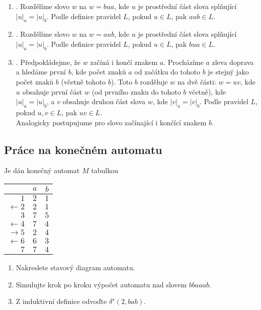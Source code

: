 \begin{enumerate}[label={}]
    \item {}. Rozdělíme slovo $w$ na $w = bua$, kde $u$ je prostřední část slova splňující
    $|u|_a = |u|_b$. Podle definice pravidel $L$, pokud $u \in L$, pak $aub \in L$.
    \item {}. Rozdělíme slovo $w$ na $w = aub$, kde $u$ je prostřední část slova splňující
    $|u|_a = |u|_b$. Podle definice pravidel $L$, pokud $u \in L$, pak $bua \in L$.
    \item {}. Předpokládejme, že $w$ začíná i končí znakem $a$. Procházíme $a$ zleva
    doprava a hledáme první $b$, kde počet znaků $a$ od začátku do tohoto $b$ je stejný jako počet znaků $b$ (včetně
    tohoto $b$). Toto $b$ rozděluje $w$ na dvě části: $w = uv$, kde $u$ obsahuje první část $w$ (od prvního znaku do
    tohoto $b$ včetně), kde $|u|_a = |u|_b$, a $v$ obsahuje druhou část slova $w$, kde $|v|_a = |v|_b$. Podle pravidel
    $L$, pokud $u, v \in L$, pak $uv \in L$. \\
    Analogicky postupujume pro slovo začínající i končící znakem $b$.
\end{enumerate}

\newpage
\subsection{Práce na konečném automatu}
Je dán konečný automat $M$ tabulkou

\begin{multicols}{2}

\begin{tabular}{|r|c|c|}
    \hline
    & $a$ & $b$\\
    \hline
    \hline
    $1$            & $2$   & $1$\\
    $\leftarrow 2$ & $2$   & $1$\\
    $3$            & $7$   & $5$\\
    $\leftarrow 4$ & $7$   & $4$\\
    $\rightarrow 5$& $2$   & $4$\\
    $\leftarrow 6$ & $6$   & $3$\\
    $ 7$           & $7$   & $4$\\
    \hline
\end{tabular}

\columnbreak

\begin{enumerate}[noitemsep]
    \item Nakreslete stavový diagram automatu.
    \item Simulujte krok po kroku výpočet automatu nad slovem $bbaaab$.
    \item Z induktivní definice odvoďte $\delta^\star(2, bab)$.
\end{enumerate}

\end{multicols}

